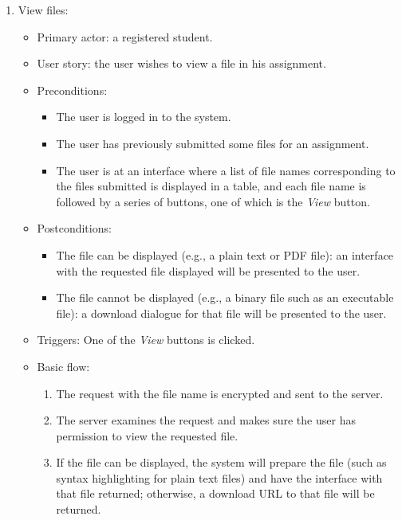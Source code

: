 \begin{enumerate}
\item View files:
\begin{itemize}
    \item Primary actor: a registered student.
    \item User story: the user wishes to view a file in his assignment.
    \item Preconditions:
        \begin{itemize}
            \item The user is logged in to the system.
            \item The user has previously submitted some files for an
                assignment.
            \item The user is at an interface where a list of file names
                corresponding to the files submitted is displayed in a table,
                and each file name is followed by a series of buttons,
                one of which is the \emph{View} button.
        \end{itemize}
    \item Postconditions:
        \begin{itemize}
            \item The file can be displayed (e.g., a plain text or PDF file): 
                an interface with the requested file
                displayed will be presented to the user.
            \item The file cannot be displayed (e.g., a binary file such as an executable
                file): a download dialogue for that file will be presented to
                the user.
        \end{itemize}
    \item Triggers: 
        One of the \emph{View} buttons is clicked.
    \item Basic flow:
        \begin{enumerate}
            \item The request with the file name is encrypted and sent to the server.
            \item The server examines the request and makes sure the user
                has permission to view the requested file.
            \item If the file can be displayed, the system will prepare the
                file (such as syntax highlighting for plain text files) and
                have the interface with that file returned; otherwise, a download
                URL to that file will be returned.
        \end{enumerate}
\end{itemize}
\end{enumerate}


